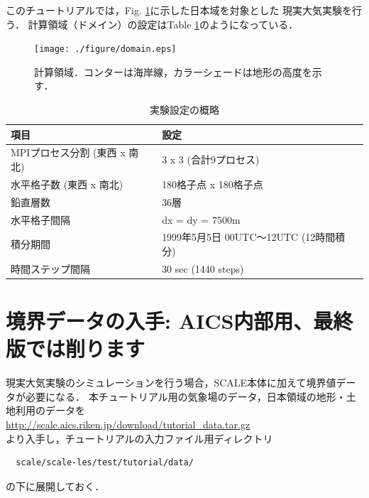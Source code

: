 
このチュートリアルでは，Fig. \ref{fig:domain}に示した日本域を対象とした
現実大気実験を行う．
計算領域（ドメイン）の設定はTable \ref{tab:grids}のようになっている．

\begin{figure}[h]
\begin{center}
  \texttt{[image: ./figure/domain.eps]}\\
  \caption{計算領域．コンターは海岸線，カラーシェードは地形の高度を示す．}
  \label{fig:domain}
\end{center}
\end{figure}

\begin{table}[h]
\begin{center}
  \caption{実験設定の概略}
  \label{tab:grids}
  \begin{tabularx}{150mm}{|l|X|} \hline
    \rowcolor[gray]{0.9} 項目 & 設定 \\ \hline
    MPIプロセス分割 (東西 x 南北) & 3 x 3 (合計9プロセス) \\ \hline
    水平格子数 (東西 x 南北) & 180格子点 x 180格子点 \\ \hline
    鉛直層数                 & 36層                  \\ \hline
    水平格子間隔             & dx = dy = 7500m       \\ \hline
    積分期間 & 1999年5月5日 00UTC～12UTC (12時間積分) \\ \hline
    時間ステップ間隔 & 30 sec (1440 steps) \\ \hline
  \end{tabularx}
\end{center}
\end{table}

\section{境界データの入手: AICS内部用、最終版では削ります}

現実大気実験のシミュレーションを行う場合，SCALE本体に加えて境界値データが必要になる．
本チュートリアル用の気象場のデータ，日本領域の地形・土地利用のデータを\\
 \url{http://scale.aics.riken.jp/download/tutorial_data.tar.gz}\\
より入手し，チュートリアルの入力ファイル用ディレクトリ
\begin{verbatim}
  scale/scale-les/test/tutorial/data/
\end{verbatim}
の下に展開しておく．

